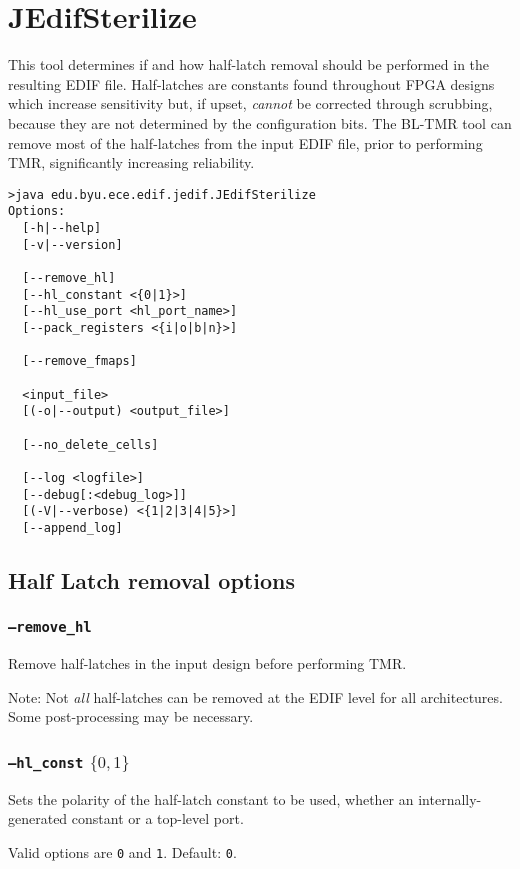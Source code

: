 \section{JEdifSterilize}
This tool determines if and how half-latch removal should be
performed in the resulting EDIF file. Half-latches are constants found
throughout FPGA designs which increase sensitivity but, if upset, \emph{cannot}
be corrected through scrubbing, because they are not determined by the
configuration bits. The BL-TMR tool can remove most of the half-latches from the
input EDIF file, prior to performing TMR, significantly increasing reliability.

\begin{verbatim}
>java edu.byu.ece.edif.jedif.JEdifSterilize
Options:
  [-h|--help]
  [-v|--version]

  [--remove_hl]
  [--hl_constant <{0|1}>]
  [--hl_use_port <hl_port_name>]
  [--pack_registers <{i|o|b|n}>]

  [--remove_fmaps]

  <input_file>
  [(-o|--output) <output_file>]

  [--no_delete_cells]

  [--log <logfile>]
  [--debug[:<debug_log>]]
  [(-V|--verbose) <{1|2|3|4|5}>]
  [--append_log]

\end{verbatim}
\subsection{Half Latch removal options}

\subsubsection{\texttt{--remove\_hl}}
Remove half-latches in the input design before performing TMR.

Note: Not \emph{all} half-latches can be removed at the EDIF 
level for all architectures. Some post-processing may be necessary.

\subsubsection{\texttt{--hl\_const} $\{0,1\}$}
Sets the polarity of the half-latch constant to be used, whether an 
internally-generated constant or a top-level port. 

Valid options are \texttt{0} and \texttt{1}. Default: \texttt{0}.

